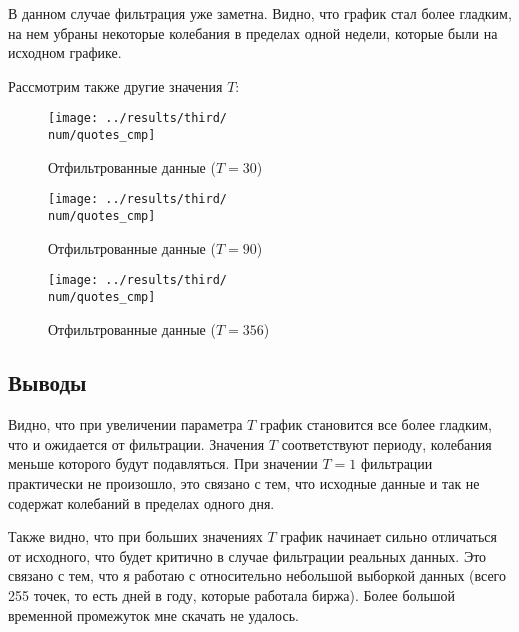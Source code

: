 В данном случае фильтрация уже заметна. Видно, что график стал более гладким,
на нем убраны некоторые колебания в пределах одной недели, которые были на исходном графике. 

\FloatBarrier
Рассмотрим также другие значения $T$: 

\def\num{3}
\def\T{30}

\begin{figure}[ht!]
    \centering
    \texttt{[image: ../results/third/\\num/quotes\_cmp]}
    \caption{Отфильтрованные данные ($T = \T$)}
    \label{fig:quotes_cmp_\num}
\end{figure}

\def\num{4}
\def\T{90}

\begin{figure}[ht!]
    \centering
    \texttt{[image: ../results/third/\\num/quotes\_cmp]}
    \caption{Отфильтрованные данные ($T = \T$)}
    \label{fig:quotes_cmp_\num}
\end{figure}


\def\num{5}
\def\T{356}

\begin{figure}[ht!]
    \centering
    \texttt{[image: ../results/third/\\num/quotes\_cmp]}
    \caption{Отфильтрованные данные ($T = \T$)}
    \label{fig:quotes_cmp_\num}
\end{figure}

\FloatBarrier
\subsection{Выводы}
Видно, что при увеличении параметра $T$ график становится все более гладким, что и ожидается от фильтрации. 
Значения $T$ соответствуют периоду, колебания меньше которого будут подавляться. При значении $T = 1$ фильтрации 
практически не произошло, это связано с тем, что исходные данные и так не содержат колебаний в пределах одного дня.

Также видно, что при больших значениях $T$ график начинает сильно отличаться от исходного, что будет 
критично в случае фильтрации реальных данных. Это связано с тем, что я работаю с относительно небольшой выборкой данных (всего 255 точек, то есть дней в году, которые работала биржа). 
Более большой временной промежуток мне скачать не удалось. 

